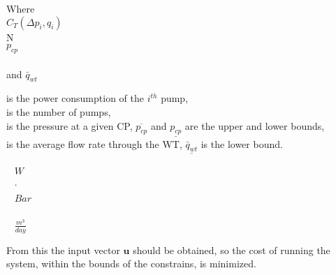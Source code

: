  \begin{minipage}[t]{0.20\textwidth}
 Where\\
 \hspace*{8mm} $C_T(\Delta{p}_i,q_i)$ \\
 \hspace*{8mm} N \\
 \hspace*{8mm} $p_{cp}$ \\
 \hspace*{8mm}  \textcolor{White}{te}\\
 and \hspace*{0.7mm} $\bar{q}_{wt}$	
 \end{minipage}
 \begin{minipage}[t]{0.68\textwidth}
 \vspace*{2mm}
 is the power consumption of the $i^{th}$ pump,\\
 is the number of pumps,\\
 is the pressure at a given CP, $\overline{p_{cp}}$ and $\underline{p_{cp}}$ are the upper and lower bounds,\\
 is the average flow rate through the WT, $\underline{\bar{q}_{wt}}$ is the lower bound.
 \end{minipage}
 \begin{minipage}[t]{0.10\textwidth}
 \vspace*{2mm}
 \textcolor{White}{te}$\unit{W}$\\
 \textcolor{White}{te}$\unit{\cdot}$\\
 \textcolor{White}{te}$\unit{Bar}$\\
 \hspace*{8mm}  \textcolor{White}{te}\\
 \textcolor{White}{te}$\unit{\frac{m^3}{day}}$
 \end{minipage}

From this the input vector $\pmb{u}$ should be obtained, so the cost of running the system, within the bounds of the constrains, is minimized. 






